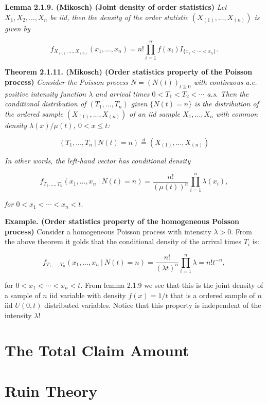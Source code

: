 \documentclass[a4paper,12pt,openany]{book}
\begin{document}
\textbf{Lemma 2.1.9. (Mikosch) (Joint density of order statistics)} \emph{Let \(X_1,X_2,...,X_n\) be iid, then the density of the order statistic \((X_{(1)},...,X_{(n)})\) is given by}

\[
f_{X_{(1)},...,X_{(n)}}(x_1,...,x_n)=n!\prod_{i=1}^n f(x_i)I_{\{x_1<\cdots <x_n\}}.
\]

\textbf{Theorem 2.1.11. (Mikosch) (Order statistics property of the Poisson process)} \emph{Consider the Poisson process \(N = (N(t))_{t\ge 0}\) with continuous a.e. positive intensity function \(\lambda\) and arrival times \(0 < T_1 < T_2 < \cdots\) a.s. Then the conditional distribution of \((T_1 ,..., T_n )\) given \(\{N (t) = n\}\) is the distribution of the ordered sample \((X_{(1)}, ... , X_{(n)})\) of an iid sample \(X_1,..., X_n\) with common density \(\lambda(x)/\mu(t)\), \(0 < x \le t\):}

\[
(T_1,...,T_n\ \vert\ N(t)=n)\stackrel{d}{=}(X_{(1)},...,X_{(n)})
\]

\emph{In other words, the left-hand vector has conditional density}

\[
f_{T_1,...,T_n}(x_1,...,x_n\ \vert\ N(t)=n)=\frac{n!}{(\mu(t))^n}\prod_{i=1}^n\lambda(x_i),
\]

\emph{for \(0<x_1<\cdots < x_n<t\).}

\textbf{Example. (Order statistics property of the homogeneous Poisson process)} Consider a homogeneous Poisson process with intensity \(\lambda> 0\). From the above theorem it golds that the conditional density of the arrival times \(T_i\) is:

\[
f_{T_1,...,T_n}(x_1,...,x_n\ \vert\ N(t)=n)=\frac{n!}{(\lambda t)^n}\prod_{i=1}^n\lambda=n!t^{-n},
\]

for \(0<x_1<\cdots < x_n<t\). From lemma 2.1.9 we see that this is the joint density of a sample of \(n\) iid variable with density \(f(x)=1/t\) that is a ordered sample of \(n\) iid \(U(0,t)\) distributed variables. Notice that this property is independent of the intensity \(\lambda\)!

\hypertarget{the-total-claim-amount}{%
\section{The Total Claim Amount}\label{the-total-claim-amount}}

\hypertarget{ruin-theory}{%
\section{Ruin Theory}\label{ruin-theory}}
\end{document}
